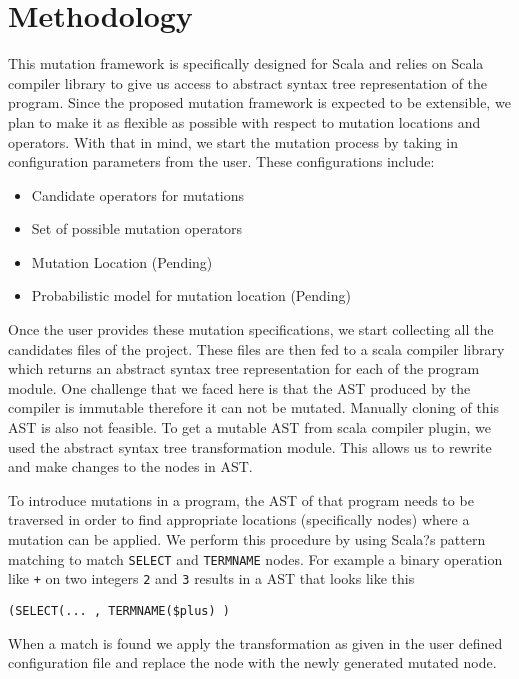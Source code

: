 \section{Methodology}

This mutation framework is specifically designed for Scala and relies on Scala compiler library to give us access to abstract syntax tree representation of the program. Since the proposed mutation framework is expected to be extensible, we plan to make it as flexible as possible with respect to mutation locations and operators.  With that in mind, we start the mutation process by taking in configuration parameters from the user. These configurations include: 
\begin{itemize}
\item Candidate operators for mutations
\item Set of possible mutation operators
\item Mutation Location (Pending)
\item Probabilistic model for mutation location (Pending)
\end{itemize}
Once the user provides these mutation specifications, we start collecting all the candidates files of the project. These files are then fed to a scala compiler library which returns an abstract syntax tree representation for each of the program module. One challenge that we faced here is that the AST produced by the compiler is immutable therefore it can not be mutated. Manually cloning of this AST is also not feasible. To get a mutable AST from scala compiler plugin, we used the  abstract syntax tree transformation module. This allows us to rewrite and make changes to the nodes in AST.

To introduce mutations in a program, the AST of that program needs to be traversed in order to find appropriate locations (specifically nodes) where a mutation can be applied. We perform this procedure by using Scala?s pattern matching to match  \texttt{SELECT} and \texttt{TERMNAME} nodes. For example a binary operation like \texttt{+}  on two integers \texttt{2} and \texttt{3} results in a AST that looks like this 

\begin{center}
\texttt{(SELECT(...  , TERMNAME(\$plus) )}
\end{center}

When a match is found we apply the transformation as given in the user defined configuration file and replace the node with the newly generated mutated node. 

